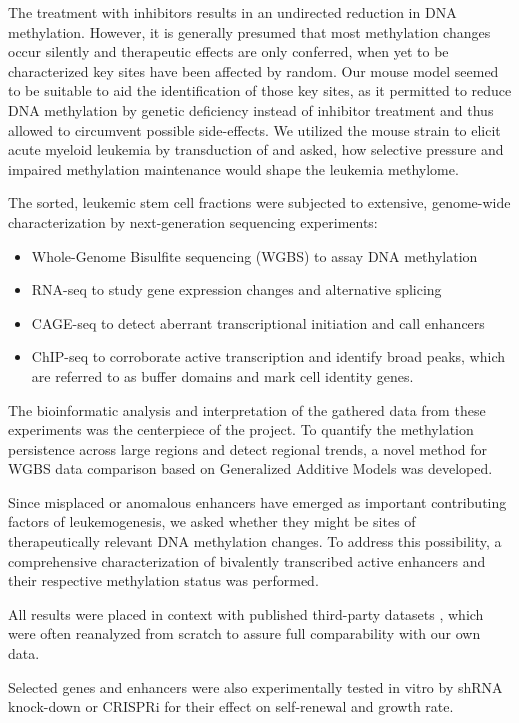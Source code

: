 The treatment with inhibitors results in an undirected reduction in DNA methylation. However, it is generally presumed that most methylation changes occur silently and therapeutic effects are only conferred, when yet to be characterized key sites have been affected by random. Our mouse model seemed to be suitable to aid the identification of those key sites, as it permitted to reduce DNA methylation by genetic  deficiency instead of inhibitor treatment and thus allowed to circumvent possible side-effects. We utilized the \dnmtchip mouse strain to elicit acute myeloid leukemia by transduction of \mllafnine and asked, how selective pressure and impaired methylation maintenance would shape the leukemia methylome. \clearpage

The \kitpos sorted, leukemic stem cell fractions were subjected to extensive, genome-wide characterization by next-generation sequencing experiments:

\begin{itemize}
	\item Whole-Genome Bisulfite sequencing (WGBS) to assay DNA methylation
	\item RNA-seq to study gene expression changes and alternative splicing
	\item CAGE-seq to detect aberrant transcriptional initiation and call enhancers
	\item \hisfourthree ChIP-seq to corroborate active transcription and identify broad peaks, which are referred to as buffer domains and mark cell identity genes\cite{Benayoun2014}.
\end{itemize} 

The bioinformatic analysis and interpretation of the gathered data from these experiments was the centerpiece of the project. To quantify the methylation persistence across large regions and detect regional trends, a novel method for WGBS data comparison based on Generalized Additive Models was developed. 

Since misplaced or anomalous enhancers have emerged as important contributing factors of leukemogenesis, we asked whether they might be sites of therapeutically relevant DNA methylation changes. To address this possibility, a comprehensive characterization of bivalently transcribed active enhancers and their respective methylation status was performed. 

All results were placed in context with published third-party datasets , which were often reanalyzed from scratch to assure full comparability with our own data. 

Selected genes and enhancers were also experimentally tested in vitro by shRNA knock-down or CRISPRi for their effect on self-renewal and growth rate. 